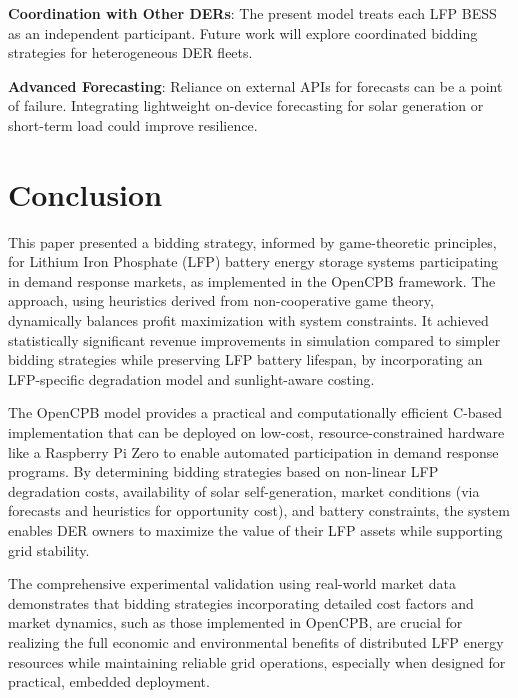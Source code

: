 \documentclass[11pt,a4paper]{article}
\begin{document}
\textbf{Coordination with Other DERs}: The present model treats each LFP BESS as an independent participant. Future work will explore coordinated bidding strategies for heterogeneous DER fleets.

\textbf{Advanced Forecasting}: Reliance on external APIs for forecasts can be a point of failure. Integrating lightweight on-device forecasting for solar generation or short-term load could improve resilience.

\section{Conclusion}
This paper presented a bidding strategy, informed by game-theoretic principles, for Lithium Iron Phosphate (LFP) battery energy storage systems participating in demand response markets, as implemented in the OpenCPB framework. The approach, using heuristics derived from non-cooperative game theory, dynamically balances profit maximization with system constraints. It achieved statistically significant revenue improvements in simulation compared to simpler bidding strategies while preserving LFP battery lifespan, by incorporating an LFP-specific degradation model and sunlight-aware costing.

The OpenCPB model provides a practical and computationally efficient C-based implementation that can be deployed on low-cost, resource-constrained hardware like a Raspberry Pi Zero to enable automated participation in demand response programs. By determining bidding strategies based on non-linear LFP degradation costs, availability of solar self-generation, market conditions (via forecasts and heuristics for opportunity cost), and battery constraints, the system enables DER owners to maximize the value of their LFP assets while supporting grid stability.

The comprehensive experimental validation using real-world market data demonstrates that bidding strategies incorporating detailed cost factors and market dynamics, such as those implemented in OpenCPB, are crucial for realizing the full economic and environmental benefits of distributed LFP energy resources while maintaining reliable grid operations, especially when designed for practical, embedded deployment.
\end{document}
